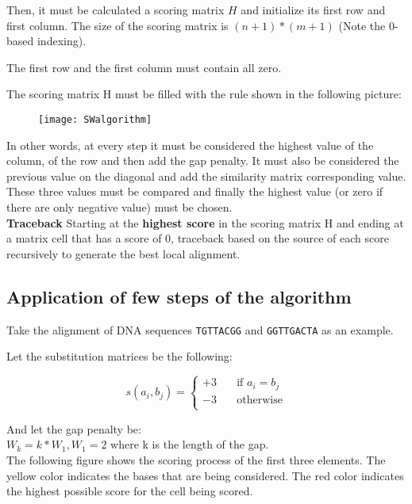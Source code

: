 Then, it must be calculated a scoring matrix $H$ and initialize its first
row and first column.
The size of the scoring matrix is $(n + 1)*(m + 1)$ (Note the 0-based
indexing).

The first row and the first column must contain all zero.

The scoring matrix H must be filled with the rule shown in the following
picture:

\begin{figure}[H]
  \centering
  \texttt{[image: SWalgorithm]}
\end{figure}

In other words, at every step it must be considered the highest value
of the column, of the row and then add the gap penalty. It must also
be considered the previous value on the diagonal and add the
similarity matrix corresponding value. These three values must be
compared and finally the highest value (or zero if there are only
negative value) must be chosen. \\

\textbf{Traceback}
Starting at the \textbf{highest score} in the scoring matrix H and ending at a
matrix cell that has a score of 0, traceback based on the source of
each score recursively to generate the best local alignment.

\subsection{Application of few steps of the algorithm}

Take the alignment of DNA sequences \texttt{TGTTACGG} and
\texttt{GGTTGACTA} as an example.

Let the substitution matrices be the following:

\[ s(a_i,b_j) =
  \begin{cases}
    +3       & \quad \text{if } a_i = b_j\\
    -3	     & \quad \text{otherwise} \\
  \end{cases}
\]

And let the gap penalty be: \\

$W_k = k*W_1, W_1 = 2$ where k is the length of the gap. \\

The following figure shows the scoring process of the first three elements.
The yellow color indicates the bases that are being considered.
The red color indicates the highest possible score for the cell being scored.

